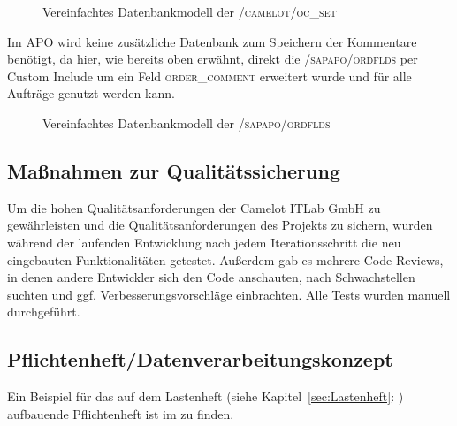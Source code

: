 \begin{figure}[htb]
	\centering
	\caption{Vereinfachtes Datenbankmodell der \textsc{/camelot/oc\_set}}
	\label{fig:ECC02}
\end{figure} 

Im \ac{APO} wird keine zusätzliche Datenbank zum Speichern der Kommentare benötigt, da hier, wie bereits oben erwähnt, direkt die \textsc{/sapapo/ordflds} per Custom Include um ein Feld \textsc{order\_comment} erweitert wurde und für alle Aufträge genutzt werden kann.  

\begin{figure}[htb]
	\centering
	\caption{Vereinfachtes Datenbankmodell der \textsc{/sapapo/ordflds}}
	\label{fig:APO01}
\end{figure} 

\subsection{Maßnahmen zur Qualitätssicherung}
\label{sec:Qualitaetssicherung}
Um die hohen Qualitätsanforderungen der Camelot ITLab GmbH zu gewährleisten und die Qualitätsanforderungen des Projekts zu sichern, wurden während der laufenden Entwicklung nach jedem Iterationsschritt die neu eingebauten Funktionalitäten getestet. Außerdem gab es mehrere Code Reviews, in denen andere Entwickler sich den Code anschauten, nach Schwachstellen suchten und ggf. Verbesserungsvorschläge einbrachten. Alle Tests wurden manuell durchgeführt.  

\subsection{Pflichtenheft/Datenverarbeitungskonzept}
\label{sec:Pflichtenheft}
Ein Beispiel für das auf dem Lastenheft (siehe Kapitel~\ref{sec:Lastenheft}: ) aufbauende Pflichtenheft ist im  zu finden.

